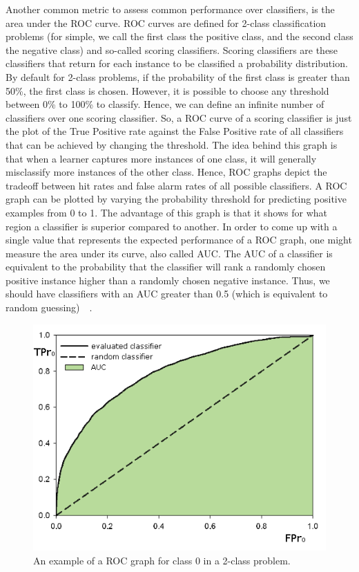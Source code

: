 Another common metric to assess common performance over classifiers, is the area under the ROC curve. ROC curves are defined for 2-class classification problems (for simple, we call the first class the positive class, and the second class the negative class) and so-called scoring classifiers. Scoring classifiers are these classifiers that return for each instance to be classified a probability distribution. By default for 2-class problems,  if the probability of the first class is greater than 50\%, the first class is chosen. However, it is possible to choose any threshold between 0\% to 100\% to classify. Hence, we can define an infinite number of classifiers over one scoring classifier. So, a ROC curve of a scoring classifier is just the plot of the True Positive rate against the False Positive rate of all classifiers that can be achieved by changing the threshold. The idea behind this graph is that when a learner captures more instances of one class, it will generally misclassify more instances of the other class. Hence, ROC graphs depict the tradeoff between hit rates and false alarm rates of all possible classifiers. A ROC graph can be plotted by varying the probability threshold for predicting positive examples from 0 to 1. The advantage of this graph is that it shows for what region a classifier is superior compared to another. In order to come up with a single value that represents the expected performance of a ROC graph, one might measure the area under its curve, also called AUC. The AUC of a classifier is equivalent to the probability that the classifier will rank a randomly chosen positive instance higher than a randomly chosen negative instance. Thus, we should have classifiers with an AUC greater than 0.5 (which is equivalent to random guessing)~\cite{roc}~\cite{_miningwith}. 

\begin{figure}[h]
\includegraphics[scale=0.60]{img/roc-example.png}
\caption{An example of a ROC graph for class $0$ in a 2-class problem.}
\end{figure}


